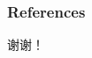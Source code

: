 \documentclass{beamer}
\begin{document}
	
	\begin{frame}
		\frametitle{References}
		
%			
%			


	\end{frame}
	
	
	\begin{frame}
		\Huge{\centerline{谢谢！}}
	\end{frame}
	
\end{document}
